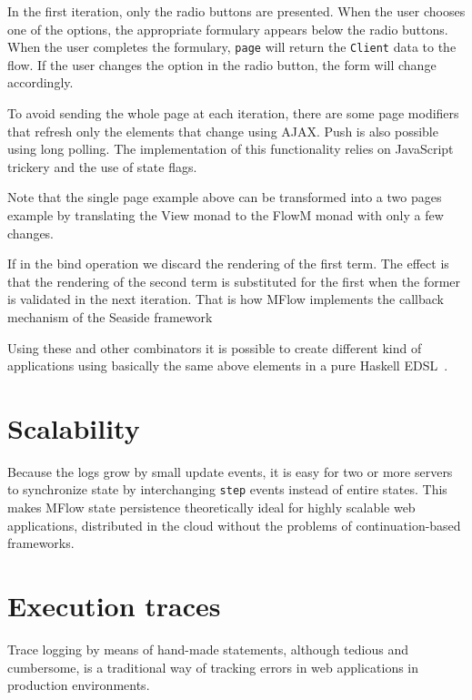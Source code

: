 \documentclass{tmr}
\begin{document}
In the first iteration, only the radio buttons are presented. When the user chooses one of the options, the appropriate formulary appears below the radio buttons. When the user completes the formulary, {\tt page} will return the {\tt Client} data to the flow. If the user changes the option in the radio button, the form will change accordingly. 
 
To avoid sending the whole page at each iteration, there are some page modifiers that refresh only the elements that change using AJAX\@. Push is also possible using long polling. The implementation of this functionality relies on JavaScript trickery and the use of state flags. 
 
Note that the single page example above can be transformed into a two pages example by translating the View monad to the FlowM monad with only a few changes. 
 
If in the bind operation we discard the rendering of the first term.  The effect is that the rendering of the second term is substituted for the first when the former is validated in the next iteration. That is how MFlow implements the callback mechanism of the Seaside framework~\cite{seasidecallback}

Using these and other combinators it is possible to create different kind of applications using basically the same above elements in a pure Haskell EDSL~\cite{auth:mflowdsl}.
 
\section{Scalability} 
 
Because the logs grow by small update events, it is easy for two or more servers to synchronize state by interchanging {\tt step} events instead of entire states. This makes MFlow state persistence theoretically ideal for highly scalable web applications, distributed in the cloud without the problems of continuation-based frameworks. 
 
 
 
 
\section{Execution traces} 
 
Trace logging by means of hand-made statements, although tedious and cumbersome, is a traditional way of tracking errors in web applications in production environments.
 
\end{document}
